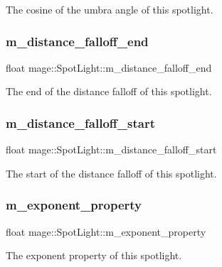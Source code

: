 The cosine of the umbra angle of this spotlight. \hypertarget{classmage_1_1_spot_light_a8e0616e3a36d1a05d800cc4a43739178}{}\label{classmage_1_1_spot_light_a8e0616e3a36d1a05d800cc4a43739178} 
\subsubsection{\texorpdfstring{m\+\_\+distance\+\_\+falloff\+\_\+end}{m\_distance\_falloff\_end}}
{\footnotesize\ttfamily float mage\+::\+Spot\+Light\+::m\+\_\+distance\+\_\+falloff\+\_\+end\hspace{0.3cm}{\ttfamily [private]}}

The end of the distance falloff of this spotlight. \hypertarget{classmage_1_1_spot_light_a96c4a4f1b77c9a6aadb82cf48248cc5d}{}\label{classmage_1_1_spot_light_a96c4a4f1b77c9a6aadb82cf48248cc5d} 
\subsubsection{\texorpdfstring{m\+\_\+distance\+\_\+falloff\+\_\+start}{m\_distance\_falloff\_start}}
{\footnotesize\ttfamily float mage\+::\+Spot\+Light\+::m\+\_\+distance\+\_\+falloff\+\_\+start\hspace{0.3cm}{\ttfamily [private]}}

The start of the distance falloff of this spotlight. \hypertarget{classmage_1_1_spot_light_ac1ac3c8c25760d8beb7e05c8caeaa6a3}{}\label{classmage_1_1_spot_light_ac1ac3c8c25760d8beb7e05c8caeaa6a3} 
\subsubsection{\texorpdfstring{m\+\_\+exponent\+\_\+property}{m\_exponent\_property}}
{\footnotesize\ttfamily float mage\+::\+Spot\+Light\+::m\+\_\+exponent\+\_\+property\hspace{0.3cm}{\ttfamily [private]}}

The exponent property of this spotlight. 